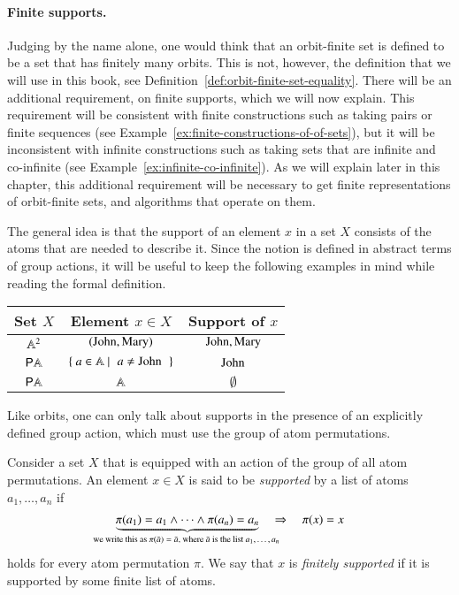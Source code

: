 \paragraph*{Finite supports.} Judging by the name alone, one would think that an orbit-finite set is defined to be a set that has finitely many orbits. This is not, however, the definition that we will use in this book, see Definition~\ref{def:orbit-finite-set-equality}. There will be an additional requirement, on finite supports, which we will now explain. This requirement will be consistent with  finite constructions such as taking pairs or finite sequences (see Example~\ref{ex:finite-constructions-of-of-sets}), but it will be inconsistent with infinite constructions such as taking sets that are infinite and co-infinite (see Example~\ref{ex:infinite-co-infinite}). As we will explain later in this chapter, this additional requirement will be necessary to get finite representations of orbit-finite sets, and algorithms that operate on them.

 The general idea is that the support of an  element $x$ in a set $X$ consists of  the atoms that are needed to describe it. Since the notion is defined in abstract terms of group actions, it will be useful to keep the following examples in mind while reading the formal definition.

\begin{center}
    \begin{tabular}{c|c|c}
        Set $X$ & Element $x \in X$ & Support of $x$\\
        \hline
        $\mathbb A^2$ & $(\text{John},\text{Mary})$ & $\text{John},\text{Mary}$\\
        ${\mathsf P} \mathbb A$ & \quad  $\setbuild{a \in \atoms}{$a \neq \john$}$ \quad & $\text{John}$\\
        ${\mathsf P} \mathbb A$ & $\mathbb A$ & $\emptyset$
    \end{tabular}
\end{center}

Like orbits, one can only talk about supports in the presence of an explicitly defined group action, which must use the group of atom permutations. 
\begin{definition}[Supports]\label{def:supports-equality}
    Consider a set $X$ that is equipped with an action of the group of all  atom permutations. An element $x \in X$ is said to be \emph{supported} by  a list of  atoms $a_1,\ldots,a_n$ if 
    \begin{align}\label{eq:support-defining-implication}
    \myunderbrace{\pi(a_1)=a_1 \land \cdots \land \pi(a_n)=a_n}{we write this as $\pi(\bar a)= \bar a$, where $\bar a$ is the list $a_1,\ldots,a_n$}  
    \quad \Rightarrow \quad 
    \pi(x) = x
    \end{align}
    holds for every atom permutation $\pi$. We say that $x$ is \emph{finitely supported} if it is supported by some finite list of atoms.
\end{definition}

